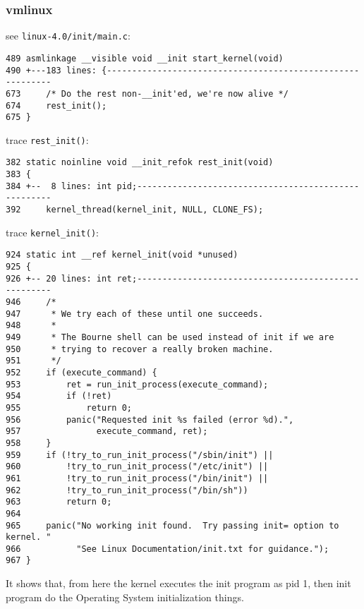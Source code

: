 \subsubsection{vmlinux}
see \texttt{linux-4.0/init/main.c}:
\begin{framed}\begin{verbatim}
489 asmlinkage __visible void __init start_kernel(void)
490 +---183 lines: {-----------------------------------------------------------
673     /* Do the rest non-__init'ed, we're now alive */
674     rest_init();
675 }
\end{verbatim}\end{framed}
trace \texttt{rest\_init()}:
\begin{framed}\begin{verbatim}
382 static noinline void __init_refok rest_init(void)
383 {
384 +--  8 lines: int pid;-----------------------------------------------------
392     kernel_thread(kernel_init, NULL, CLONE_FS);
\end{verbatim}\end{framed}
trace \texttt{kernel\_init()}:
\begin{framed}\begin{verbatim}
924 static int __ref kernel_init(void *unused)
925 {
926 +-- 20 lines: int ret;-----------------------------------------------------
946     /*
947      * We try each of these until one succeeds.
948      *
949      * The Bourne shell can be used instead of init if we are
950      * trying to recover a really broken machine.
951      */
952     if (execute_command) {
953         ret = run_init_process(execute_command);
954         if (!ret)
955             return 0;
956         panic("Requested init %s failed (error %d).",
957               execute_command, ret);
958     }
959     if (!try_to_run_init_process("/sbin/init") ||
960         !try_to_run_init_process("/etc/init") ||
961         !try_to_run_init_process("/bin/init") ||
962         !try_to_run_init_process("/bin/sh"))
963         return 0;
964 
965     panic("No working init found.  Try passing init= option to kernel. "
966           "See Linux Documentation/init.txt for guidance.");
967 }
\end{verbatim}\end{framed}
It shows that, from here the kernel executes the init program as pid 1, then init program do the Operating System initialization things.

